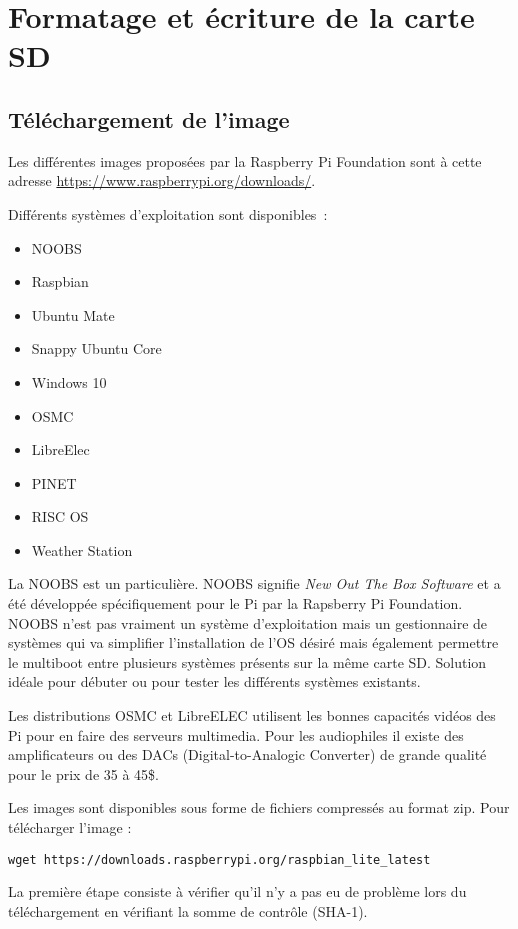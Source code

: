 \section{Formatage et écriture de la carte SD}

\subsection{Téléchargement de l'image}

Les différentes images proposées par la Raspberry Pi Foundation sont à cette adresse \href{https://www.raspberrypi.org/downloads/}{https://www.raspberrypi.org/downloads/}.

Différents systèmes d'exploitation sont disponibles~:
\begin{itemize}
	\item NOOBS
	\item Raspbian
	\item Ubuntu Mate
	\item Snappy Ubuntu Core
	\item Windows 10
	\item OSMC
	\item LibreElec
	\item PINET
	\item RISC OS
	\item Weather Station
\end{itemize}

La NOOBS est un particulière.  NOOBS signifie \emph{New Out The Box Software} et a été développée spécifiquement pour le Pi par la Rapsberry Pi Foundation. NOOBS n'est pas vraiment un système d'exploitation mais un gestionnaire de systèmes qui va simplifier l'installation de l'OS désiré mais également permettre le multiboot entre plusieurs systèmes présents sur la même carte SD. Solution idéale pour débuter ou pour tester les différents systèmes existants.

Les distributions OSMC et LibreELEC utilisent les bonnes capacités vidéos des Pi pour en faire des serveurs multimedia. Pour les audiophiles il existe des amplificateurs ou des DACs (Digital-to-Analogic Converter) de grande qualité pour le prix de 35 à 45\$.

Les images sont disponibles sous forme de fichiers compressés au format zip. Pour télécharger l'image :
\begin{verbatim}
wget https://downloads.raspberrypi.org/raspbian_lite_latest
\end{verbatim}

La première étape consiste à vérifier qu'il n'y a pas eu de problème lors du téléchargement en vérifiant la somme de contrôle (SHA-1).

